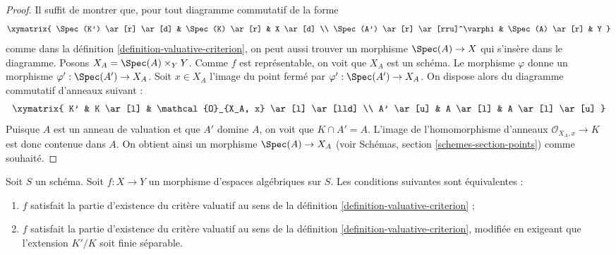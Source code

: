 \begin{proof}
Il suffit de montrer que, pour tout diagramme commutatif de la forme
$$
\xymatrix{
\Spec(K') \ar[r] \ar[d] & \Spec(K) \ar[r] & X \ar[d] \\
\Spec(A') \ar[r] \ar[rru]^\varphi & \Spec(A) \ar[r] & Y
}
$$
comme dans la définition \ref{definition-valuative-criterion}, on peut aussi
trouver un morphisme $\Spec(A) \to X$ qui s'insère dans le diagramme.
Posons $X_A = \Spec(A) \times_Y Y$. Comme $f$ est représentable, on voit
que $X_A$ est un schéma. Le morphisme $\varphi$ donne un morphisme
$\varphi' : \Spec(A') \to X_A$. Soit $x \in X_A$ l'image du
point fermé par $\varphi' : \Spec(A') \to X_A$. On dispose alors du
diagramme commutatif d'anneaux suivant :
$$
\xymatrix{
K' & K \ar[l] & \mathcal{O}_{X_A, x} \ar[l] \ar[lld] \\
A' \ar[u] & A \ar[l] & A \ar[l] \ar[u]
}
$$
Puisque $A$ est un anneau de valuation et que $A'$ domine $A$, on voit
que $K \cap A' = A$. L'image de l'homomorphisme d'anneaux $\mathcal{O}_{X_A, x} \to K$
est donc contenue dans $A$. On obtient ainsi un morphisme $\Spec(A) \to X_A$ (voir
Schémas, section \ref{schemes-section-points})
comme souhaité.
\end{proof}

\begin{lemma}
\label{lemma-finite-separable-enough}
Soit $S$ un schéma.
Soit $f : X \to Y$ un morphisme d'espaces algébriques sur $S$.
Les conditions suivantes sont équivalentes :
\begin{enumerate}
\item $f$ satisfait la partie d'existence du critère valuatif
au sens de la définition \ref{definition-valuative-criterion} ;
\item $f$ satisfait la partie d'existence du critère valuatif
au sens de la définition \ref{definition-valuative-criterion}, modifiée en
exigeant que l'extension $K'/K$ soit finie séparable.
\end{enumerate}
\end{lemma}


